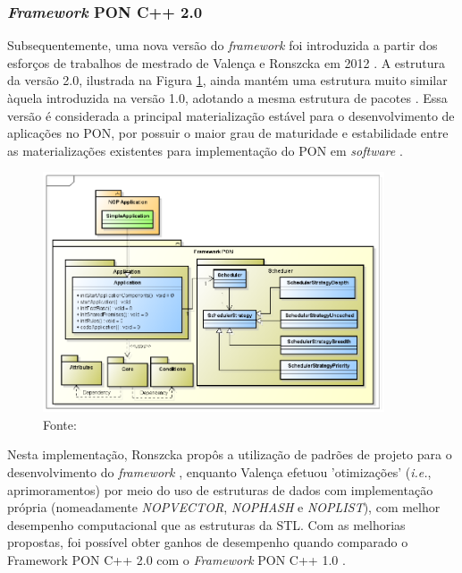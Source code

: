 \FloatBarrier

\subsubsection{\textit{Framework} PON C++ 2.0}\label{sec:fw2_revisao}

Subsequentemente, uma nova versão do \textit{framework} foi introduzida a partir
dos esforços de trabalhos de mestrado de Valença e Ronszcka em 2012
\cite{msc_valenca_2012,msc_Ronszcka_2012}. A estrutura da versão 2.0, ilustrada
na Figura \ref{fig:fw2_struct}, ainda mantém uma estrutura muito similar àquela
introduzida na versão 1.0, adotando a mesma estrutura de pacotes
\cite{msc_Ronszcka_2012}. Essa versão é considerada a principal materialização
estável para o desenvolvimento de aplicações no PON, por possuir o maior grau de
maturidade e estabilidade entre as materializações existentes para implementação
do PON em \textit{software} \cite{doc_ronszcka_2019}.

\begin{figure}[!htb]
  \centering
  \includegraphics[width=0.9\textwidth]{../figures/fw2_structure.png}
  \caption{Estrutura do \textit{framework} C++ 2.0} \caption*{Fonte:
    }
  \label{fig:fw2_struct}
\end{figure}

Nesta implementação, Ronszcka propôs a utilização de padrões de projeto para o
desenvolvimento do \textit{framework} \cite{msc_Ronszcka_2012}, enquanto Valença
efetuou 'otimizações' (\textit{i.e.}, aprimoramentos) por meio do uso de
estruturas de dados com implementação própria (nomeadamente \textit{NOPVECTOR},
\textit{NOPHASH} e \textit{NOPLIST}), com melhor desempenho computacional que as
estruturas da STL. Com as melhorias propostas, foi possível obter ganhos de
desempenho quando comparado o Framework PON C++ 2.0 com o \textit{Framework} PON
C++ 1.0 \cite{msc_valenca_2012}. 

